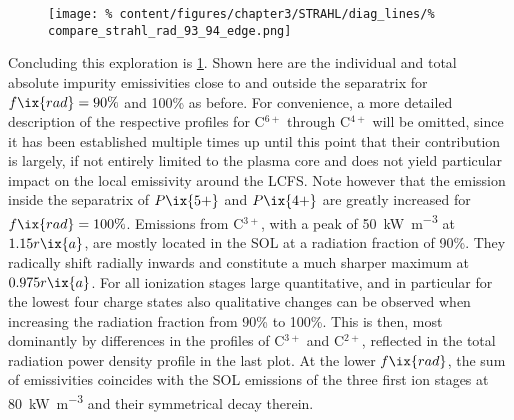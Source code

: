 %
        \begin{figure}[t]%
            \centering%
                \texttt{[image: \%
                    content/figures/chapter3/STRAHL/diag\_lines/\%
                    compare\_strahl\_rad\_93\_94\_edge.png]}%
            \label{fig:total_rad_93_94_edge}%
        \end{figure}%
%
        Concluding this exploration is \cref{fig:total_rad_93_94_edge}. Shown here are the individual and total absolute impurity emissivities close to and outside the separatrix for $f\ix{rad}=90\%$ and 100\% as before. For convenience, a more detailed description of the respective profiles for C$^{6+}$ through C$^{4+}$ will be omitted, since it has been established multiple times up until this point that their contribution is largely, if not entirely limited to the plasma core and does not yield particular impact on the local emissivity around the LCFS. Note however that the emission inside the separatrix of $P\ix{5+}$ and $P\ix{4+}$ are greatly increased for $f\ix{rad}=100\%$. Emissions from C$^{3+}$, with a peak of \SI{50}{\kilo\watt\per\cubic\meter} at $1.15r\ix{a}$, are mostly located in the SOL at a radiation fraction of 90\%. They radically shift radially inwards and constitute a much sharper maximum at $0.975r\ix{a}$. For all ionization stages large quantitative, and in particular for the lowest four charge states also qualitative changes can be observed when increasing the radiation fraction from 90\% to 100\%. This is then, most dominantly by differences in the profiles of C$^{3+}$ and C$^{2+}$, reflected in the total radiation power density profile in the last plot. At the lower $f\ix{rad}$, the sum of emissivities coincides with the SOL emissions of the three first ion stages at \SI{80}{\kilo\watt\per\cubic\meter} and their symmetrical decay therein.\\%
%
        \newline%
